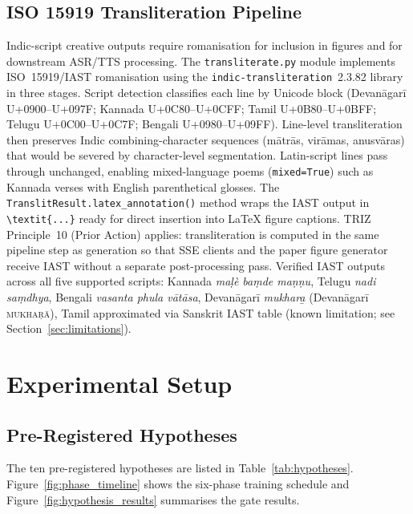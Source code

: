\documentclass[journal,onecolumn,11pt]{IEEEtran}
\begin{document}
\subsection{ISO 15919 Transliteration Pipeline}\label{sec:translit}

Indic-script creative outputs require romanisation for inclusion in figures
and for downstream ASR/TTS processing.
The \texttt{transliterate.py} module implements ISO~15919/IAST romanisation
using the \texttt{indic-transliteration}~2.3.82 library in three stages.
Script detection classifies each line by Unicode block (Devanāgarī
U+0900--U+097F; Kannada U+0C80--U+0CFF; Tamil U+0B80--U+0BFF; Telugu
U+0C00--U+0C7F; Bengali U+0980--U+09FF).
Line-level transliteration then preserves Indic combining-character
sequences (mātrās, virāmas, anusvāras) that would be severed by
character-level segmentation.
Latin-script lines pass through unchanged, enabling mixed-language poems
(\texttt{mixed=True}) such as Kannada verses with English parenthetical
glosses.
The \texttt{TranslitResult.latex\_annotation()} method wraps the IAST output
in \verb|\textit{...}| ready for direct insertion into LaTeX figure
captions.
TRIZ Principle~10 (Prior Action) applies: transliteration is computed in
the same pipeline step as generation so that SSE clients and the paper
figure generator receive IAST without a separate post-processing pass.
Verified IAST outputs across all five supported scripts:
Kannada \textit{ma\d{l}\`{e} ba\d{m}de ma\d{n}\d{n}u},
Telugu \textit{nadi sa\d{m}dhya},
Bengali \textit{vasanta phula v\={a}t\={a}sa},
Devanāgarī \textit{mukhar\b{a}} (Devanāgarī \textsc{mukha\d{r}ā}),
Tamil approximated via Sanskrit IAST table (known limitation; see Section~\ref{sec:limitations}).

\section{Experimental Setup}\label{sec:experiments}

\subsection{Pre-Registered Hypotheses}

The ten pre-registered hypotheses are listed in
Table~\ref{tab:hypotheses}.
Figure~\ref{fig:phase_timeline} shows the six-phase training schedule and
Figure~\ref{fig:hypothesis_results} summarises the gate results.
\end{document}
